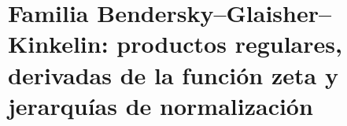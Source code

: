 \chapter{Familia Bendersky--Glaisher--Kinkelin: productos regulares, derivadas de la función zeta y jerarquías de normalización}
\label{chap:p3-final:43:bendersky_glaisher}

